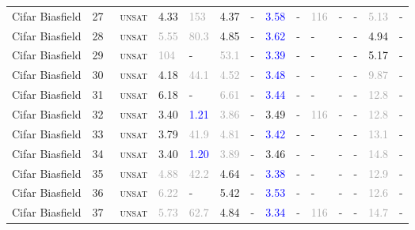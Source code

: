 \begin{center}
{\begin{longtable}{@{}llllllllllllll@{}}
Cifar Biasfield & 27 & ~\textsc{unsat} & \textcolor{second}{4.33} & \textcolor{darkgray}{153} & \textcolor{second}{4.37} & - & \textcolor{blue}{3.58} & - & \textcolor{darkgray}{116} & - & - & \textcolor{darkgray}{5.13} & - \\
Cifar Biasfield & 28 & ~\textsc{unsat} & \textcolor{darkgray}{5.55} & \textcolor{darkgray}{80.3} & \textcolor{second}{4.85} & - & \textcolor{blue}{3.62} & - & - & - & - & \textcolor{second}{4.94} & - \\
Cifar Biasfield & 29 & ~\textsc{unsat} & \textcolor{darkgray}{104} & - & \textcolor{darkgray}{53.1} & - & \textcolor{blue}{3.39} & - & - & - & - & \textcolor{second}{5.17} & - \\
Cifar Biasfield & 30 & ~\textsc{unsat} & \textcolor{second}{4.18} & \textcolor{darkgray}{44.1} & \textcolor{darkgray}{4.52} & - & \textcolor{blue}{3.48} & - & - & - & - & \textcolor{darkgray}{9.87} & - \\
Cifar Biasfield & 31 & ~\textsc{unsat} & \textcolor{second}{6.18} & - & \textcolor{darkgray}{6.61} & - & \textcolor{blue}{3.44} & - & - & - & - & \textcolor{darkgray}{12.8} & - \\
Cifar Biasfield & 32 & ~\textsc{unsat} & \textcolor{second}{3.40} & \textcolor{blue}{1.21} & \textcolor{darkgray}{3.86} & - & \textcolor{second}{3.49} & - & \textcolor{darkgray}{116} & - & - & \textcolor{darkgray}{12.8} & - \\
Cifar Biasfield & 33 & ~\textsc{unsat} & \textcolor{second}{3.79} & \textcolor{darkgray}{41.9} & \textcolor{darkgray}{4.81} & - & \textcolor{blue}{3.42} & - & - & - & - & \textcolor{darkgray}{13.1} & - \\
Cifar Biasfield & 34 & ~\textsc{unsat} & \textcolor{second}{3.40} & \textcolor{blue}{1.20} & \textcolor{darkgray}{3.89} & - & \textcolor{second}{3.46} & - & - & - & - & \textcolor{darkgray}{14.8} & - \\
Cifar Biasfield & 35 & ~\textsc{unsat} & \textcolor{darkgray}{4.88} & \textcolor{darkgray}{42.2} & \textcolor{second}{4.64} & - & \textcolor{blue}{3.38} & - & - & - & - & \textcolor{darkgray}{12.9} & - \\
Cifar Biasfield & 36 & ~\textsc{unsat} & \textcolor{darkgray}{6.22} & - & \textcolor{second}{5.42} & - & \textcolor{blue}{3.53} & - & - & - & - & \textcolor{darkgray}{12.6} & - \\
Cifar Biasfield & 37 & ~\textsc{unsat} & \textcolor{darkgray}{5.73} & \textcolor{darkgray}{62.7} & \textcolor{second}{4.84} & - & \textcolor{blue}{3.34} & - & \textcolor{darkgray}{116} & - & - & \textcolor{darkgray}{14.7} & - \\

\end{longtable}}
\end{center}
